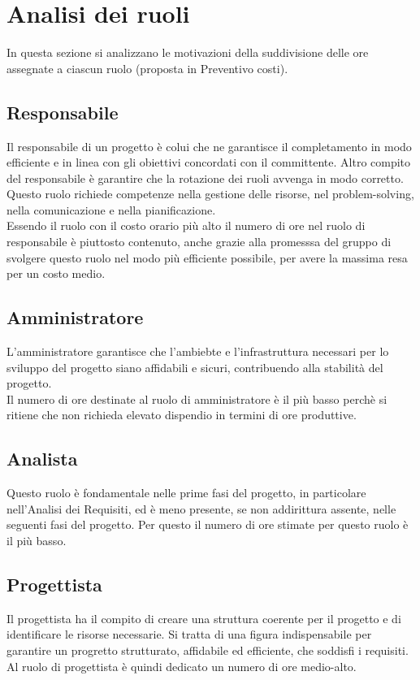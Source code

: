 \section{Analisi dei ruoli}
In questa sezione si analizzano le motivazioni della suddivisione delle ore assegnate a ciascun ruolo (proposta in Preventivo costi). 


\subsection{Responsabile}
Il responsabile di un progetto è colui che ne garantisce il completamento in modo efficiente e in linea con gli obiettivi concordati con il committente. Altro compito del responsabile è garantire che la rotazione dei ruoli avvenga in modo corretto. Questo ruolo richiede competenze nella gestione delle risorse, nel problem-solving, nella comunicazione e nella pianificazione. 
\\
Essendo il ruolo con il costo orario più alto il numero di ore nel ruolo di responsabile è piuttosto contenuto, anche grazie alla promesssa del gruppo di svolgere questo ruolo nel modo più efficiente possibile, per avere la massima resa per un costo medio.

\subsection{Amministratore}

L'amministratore garantisce che l'ambiebte e l'infrastruttura necessari per lo sviluppo del progetto siano affidabili e sicuri, contribuendo alla stabilità del progetto.
\\
Il numero di ore destinate al ruolo di amministratore è il più basso perchè si ritiene che non richieda elevato dispendio in termini di ore produttive.

\subsection{Analista}
Questo ruolo è fondamentale nelle prime fasi del progetto, in particolare nell'Analisi dei Requisiti, ed è meno presente, se non addirittura assente, nelle seguenti fasi del progetto. Per questo il numero di ore stimate per questo ruolo è il più basso.

\subsection{Progettista}
Il progettista ha il compito di creare una struttura coerente per il progetto e di identificare le risorse necessarie. Si tratta di una figura indispensabile per garantire un progretto strutturato, affidabile ed efficiente, che soddisfi i requisiti.
\\
Al ruolo di progettista è quindi dedicato un numero di ore medio-alto.

